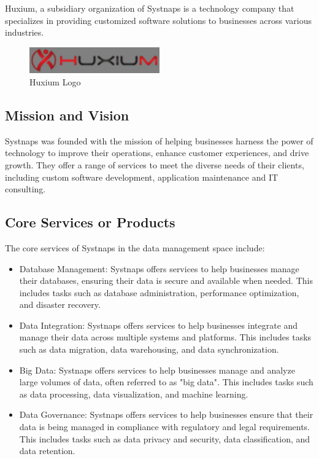 Huxium, a subsidiary organization of Systnaps is a technology company that specializes in providing customized software solutions to businesses across various industries. 


\begin{figure}[!ht]\centering
\includegraphics[width=0.5\textwidth,angle=00]{assets/fb.png}
\caption{Huxium Logo}
\end{figure}


 \subsection{Mission and Vision }

Systnaps was founded with the mission of helping businesses harness the power of technology to improve their operations, enhance customer experiences, and drive growth. They offer a range of services to meet the diverse needs of their clients, including custom software development, application maintenance and IT consulting. 

\subsection{Core Services or Products }

The core services of Systnaps in the data management space include: 
\begin{itemize}[label={--}]
    \item Database Management: Systnaps offers services to help businesses manage their databases, ensuring their data is secure and available when needed. This includes tasks such as database administration, performance optimization, and disaster recovery. 

\item Data Integration: Systnaps offers services to help businesses integrate and manage their data across multiple systems and platforms. This includes tasks such as data migration, data warehousing, and data synchronization. 

\item Big Data: Systnaps offers services to help businesses manage and analyze large volumes of data, often referred to as "big data". This includes tasks such as data processing, data visualization, and machine learning. 

\item  Data Governance: Systnaps offers services to help businesses ensure that their data is being managed in compliance with regulatory and legal requirements. This includes tasks such as data privacy and security, data classification, and data retention. 

 \end{itemize}

